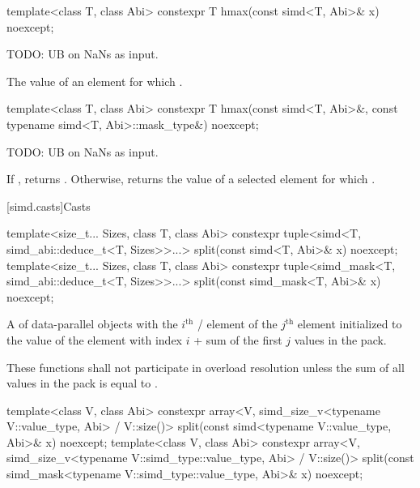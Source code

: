 \begin{itemdecl}
template<class T, class Abi> constexpr T hmax(const simd<T, Abi>& x) noexcept;
\end{itemdecl}

\begin{itemdescr}
  \pnum\expects
  TODO: UB on NaNs as input.

  \pnum\returns
  The value of an element  for which  \foralli.
\end{itemdescr}

\begin{itemdecl}
template<class T, class Abi>
  constexpr T hmax(const simd<T, Abi>&, const typename simd<T, Abi>::mask_type&) noexcept;
\end{itemdecl}

\begin{itemdescr}
  \pnum\expects
  TODO: UB on NaNs as input.

  \pnum\returns
  If , returns .
  Otherwise, returns the value of a selected element  for which  \forallmaskedi.
\end{itemdescr}

[simd.casts]{Casts}

\begin{itemdecl}
template<size_t... Sizes, class T, class Abi>
  constexpr tuple<simd<T, simd_abi::deduce_t<T, Sizes>>...>
    split(const simd<T, Abi>& x) noexcept;
template<size_t... Sizes, class T, class Abi>
  constexpr tuple<simd_mask<T, simd_abi::deduce_t<T, Sizes>>...>
    split(const simd_mask<T, Abi>& x) noexcept;
\end{itemdecl}

\begin{itemdescr}
  \pnum\returns
  A  of data-parallel objects with the $i^\text{th}$ / element of the $j^\text{th}$  element initialized to the value of the element  with index $i$ + sum of the first $j$ values in the  pack.

  \pnum\remarks
  These functions shall not participate in overload resolution unless the sum of all values in the  pack is equal to .
\end{itemdescr}

\begin{itemdecl}
template<class V, class Abi>
  constexpr array<V, simd_size_v<typename V::value_type, Abi> / V::size()>
    split(const simd<typename V::value_type, Abi>& x) noexcept;
template<class V, class Abi>
  constexpr array<V, simd_size_v<typename V::simd_type::value_type, Abi> / V::size()>
    split(const simd_mask<typename V::simd_type::value_type, Abi>& x) noexcept;
\end{itemdecl}

